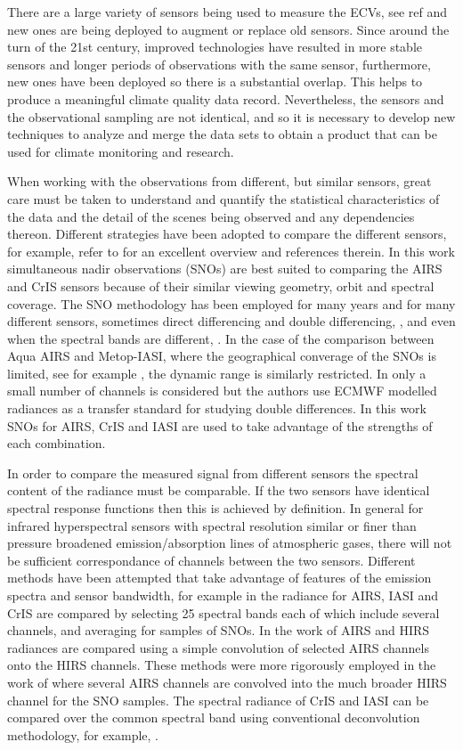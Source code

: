 \documentclass[11pt]{article}
\begin{document}
There are a large variety of sensors being used to measure the ECVs, see ref \cite{Hollmann2013} and new ones are being deployed to augment or replace old sensors.  Since around the turn of the 21st century, improved technologies have resulted in more stable sensors and longer periods of observations with the same sensor, furthermore, new ones have been deployed so there is a substantial overlap. This helps to produce a meaningful climate quality data record. Nevertheless, the sensors and the observational sampling are not identical, and so it is necessary to develop new techniques to analyze and merge the data sets to obtain a product that can be used for climate monitoring and research.

When working with the observations from different, but similar sensors, great care must be taken to understand and quantify the statistical characteristics of the data and the detail of the scenes being observed and any dependencies thereon. Different strategies have been adopted to compare the different sensors, for example, refer to \cite{Chander2013} for an excellent overview and references therein. In this work simultaneous nadir observations (SNOs) are best suited to comparing the AIRS and CrIS sensors because of their similar viewing geometry, orbit and spectral coverage. The SNO methodology has been employed for many years and for many different sensors, sometimes direct differencing \cite{Wang2007} and double differencing, \cite{Wang2011}, and even when the spectral bands are different, \cite{Uprety2013}. In the case of the comparison between Aqua AIRS and Metop-IASI, where the geographical converage of the SNOs is limited, see for example \cite{GSICS2008}, the dynamic range is similarly restricted. In \cite{Elliott2009} only a small number of channels is considered but the authors use ECMWF modelled radiances as a transfer standard for studying double differences. In this work SNOs for AIRS, CrIS and IASI are used to take advantage of the strengths of each combination.

In order to compare the measured signal from different sensors the spectral content of the radiance must be comparable. If the two sensors have identical spectral response functions then this is achieved by definition. In general for infrared hyperspectral sensors with spectral resolution similar or finer than pressure broadened emission/absorption lines of atmospheric gases, there will not be sufficient correspondance of channels between the two sensors. Different methods have been attempted that take advantage of features of the emission spectra and sensor bandwidth, for example in \cite{Wang2015} the radiance for AIRS, IASI and CrIS are compared by selecting 25 spectral bands each of which include several channels, and averaging for samples of SNOs. In the work of \cite{Ciren2003} AIRS and HIRS radiances are compared using a simple convolution of selected AIRS channels onto the HIRS channels. These methods were more rigorously employed in the work of \cite{Wang2007} where several AIRS channels are convolved into the much broader HIRS channel for the SNO samples. The spectral radiance of CrIS and IASI can be compared over the common spectral band using conventional deconvolution methodology, for example, \cite{Wang2015}.
\end{document}
